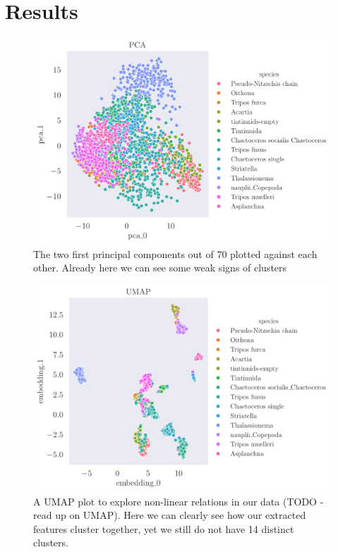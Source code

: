 \section{Results}\label{sec:results}

%
%

\begin{figure}[H]
    \centering
    \includegraphics[width=1.1\linewidth]{examples/tests_eb/figs/pca0_pca1.pdf}
    \caption{The two first principal components out of 70 plotted against each other. Already here we can see some weak signs of clusters}
    \label{fig:pca0pca1}
\end{figure}

\begin{figure}[H]
    \centering
    \includegraphics[width=1.1\linewidth]{examples/tests_eb/figs/umap.pdf}
    \caption{A UMAP plot to explore non-linear relations in our data (TODO - read up on UMAP). Here we can clearly see how our extracted features cluster together, yet we still do not have 14 distinct clusters.}
    \label{fig:enter-label}
\end{figure}

